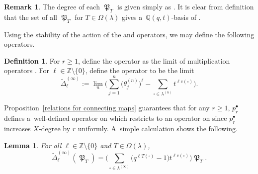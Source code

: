 \documentclass[pdftex]{sigma}
\numberwithin{equation}{section}
\newtheorem{Lemma}[Theorem]{Lemma}
\theoremstyle{definition}
\newtheorem{Definition}[Theorem]{Definition}
\newtheorem{Remark}[Theorem]{Remark}
\DeclareMathOperator{\MacD}{\mathfrak{P}}
\begin{document}
{\samepage\begin{Remark}
 The degree of each $\MacD_T$ is given simply as
 \smash{$
 \mathrm{deg}(\MacD_T) = \deg(T) = \sum_{\square \in \lambda^{(\infty)}} T(\square)$}.
 It is clear from definition that the set of all $\MacD_T$ for $T \in \Omega(\lambda)$ gives a~$\mathbb{Q}(q,t)$-basis of .
\end{Remark}

Using the stability of the action of the  and  operators, we may define the following operators.}

\begin{Definition}\label{MacD operator Definition}
 For $r \geq 1$, define the operator  as the limit of multiplication operators .
 For $\ell \in \mathbb{Z}\setminus \{0\}$, define the operator  to be the limit
 \[
 \widetilde{\Delta}_{\ell}^{(\infty)}:= \lim_n \Biggl(\sum_{j=1}^{n}\bigl(\theta^{(n)}_j\bigr)^{\ell} - \sum_{\square \in \lambda^{(n)}} t^{\ell c(\square)} \Biggr).
 \]
\end{Definition}

Proposition~\ref{relations for connecting maps} guarantees that for any $r\geq 1$, $p_r^{\bullet}$ defines a~well-defined operator on  which restricts to an operator on  since $p_r^{\bullet}$ increases $X$-degree by $r$ uniformly. A~simple calculation shows the following.

\begin{Lemma}\label{action of MacD operator}
 For all $\ell \in \mathbb{Z}\setminus \{0\}$ and $T \in \Omega(\lambda)$,
 \[
 \widetilde{\Delta}_{\ell}^{(\infty)}( \MacD_T)= \biggl( \sum_{\square \in \lambda^{(\infty)}} \bigl(q^{\ell T(\square)} -1\bigr)t^{\ell c(\square)} \biggr) \MacD_T.
 \]

\end{Lemma}
\end{document}
